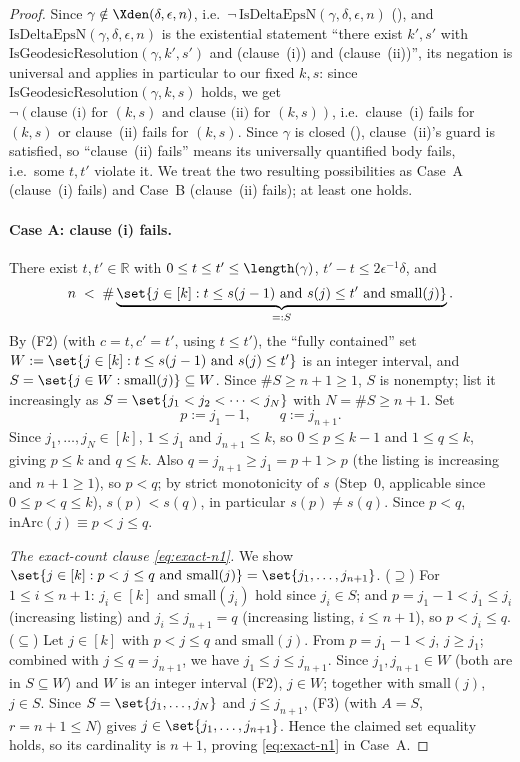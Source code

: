 \begin{proof}
  Since $\gamma \notin \Xden(\delta,\epsilon,n)$, i.e.\ $\neg\,\mathrm{IsDeltaEpsN}(\gamma,\delta,
  \epsilon,n)$ (), and $\mathrm{IsDeltaEpsN}(\gamma,\delta,\epsilon,n)$ is the
  existential statement ``there exist $k',s'$ with $\mathrm{IsGeodesicResolution}(\gamma,k',s')$
  and (clause~(i)) and (clause~(ii))'', its negation is universal and applies in particular to our
  fixed $k,s$: since $\mathrm{IsGeodesicResolution}(\gamma,k,s)$ holds, we get
  $\neg(\text{clause~(i) for } (k,s) \text{ and clause~(ii) for } (k,s))$, i.e.\ clause~(i) fails
  for $(k,s)$ or clause~(ii) fails for $(k,s)$. Since $\gamma$ is closed
  (), clause~(ii)'s guard is satisfied, so ``clause~(ii) fails'' means its
  universally quantified body fails, i.e.\ some $t,t'$ violate it. We treat the two resulting
  possibilities as Case~A (clause~(i) fails) and Case~B (clause~(ii) fails); at least one holds.

  \paragraph{Case A: clause (i) fails.} There exist $t,t'\in\mathbb{R}$ with $0\le t\le t'\le
  \length(\gamma)$, $t'-t\le2\epsilon^{-1}\delta$, and
  \[
    n \;<\; \#\underbrace{\set{j\in[k] : t\le s(j-1) \text{ and } s(j)\le t' \text{ and }
    \mathrm{small}(j)}}_{=:S}
    .
  \]
  By (F2) (with $c=t,c'=t'$, using $t\le t'$), the ``fully contained'' set $W:=\set{j\in[k] :
  t\le s(j-1) \text{ and } s(j)\le t'}$ is an integer interval, and $S = \set{j\in W :
  \mathrm{small}(j)}\subseteq W$. Since $\#S\ge n+1\ge1$, $S$ is nonempty; list it increasingly as
  $S=\set{j_1<j_2<\dots<j_N}$ with $N=\#S\ge n+1$. Set
  \[
    p := j_1-1 , \qquad q := j_{n+1} .
  \]
  Since $j_1,\dots,j_N\in[k]$, $1\le j_1$ and $j_{n+1}\le k$, so $0\le p\le k-1$ and $1\le q\le k$,
  giving $p\le k$ and $q\le k$. Also $q=j_{n+1}\ge j_1 = p+1 > p$ (the listing is increasing and
  $n+1\ge1$), so $p<q$; by strict monotonicity of $s$ (Step~0, applicable since $0\le p<q\le k$),
  $s(p)<s(q)$, in particular $s(p)\ne s(q)$. Since $p<q$, $\mathrm{inArc}(j) \equiv p<j\le q$.

  \emph{The exact-count clause \eqref{eq:exact-n1}.} We show $\set{j\in[k] : p<j\le q \text{ and }
  \mathrm{small}(j)} = \set{j_1,\dots,j_{n+1}}$.
  ($\supseteq$) For $1\le i\le n+1$: $j_i\in[k]$ and $\mathrm{small}(j_i)$ hold since $j_i\in S$;
  and $p=j_1-1<j_1\le j_i$ (increasing listing) and $j_i\le j_{n+1}=q$ (increasing listing,
  $i\le n+1$), so $p<j_i\le q$.
  ($\subseteq$) Let $j\in[k]$ with $p<j\le q$ and $\mathrm{small}(j)$. From $p=j_1-1<j$, $j\ge j_1$;
  combined with $j\le q=j_{n+1}$, we have $j_1\le j\le j_{n+1}$. Since $j_1,j_{n+1}\in W$
  (both are in $S\subseteq W$) and $W$ is an integer interval (F2), $j\in W$; together with
  $\mathrm{small}(j)$, $j\in S$. Since $S=\set{j_1,\dots,j_N}$ and $j\le j_{n+1}$, (F3) (with
  $A=S$, $r=n+1\le N$) gives $j\in\set{j_1,\dots,j_{n+1}}$.
  Hence the claimed set equality holds, so its cardinality is $n+1$, proving \eqref{eq:exact-n1}
  in Case~A.


\end{proof}

